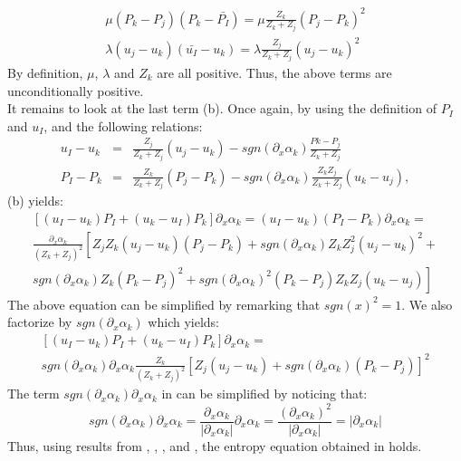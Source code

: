 \begin{eqnarray}
\label{eq:ent4}
\mu (P_k-P_j)(P_k-\bar{P_I}) = \mu \frac{Z_k}{Z_k+Z_j} (P_j - P_k)^2\nonumber\\
\lambda(u_j-u_k)(\bar{u_I}-u_k) = \lambda \frac{Z_j}{Z_k+Z_j} (u_j - u_k)^2 
\end{eqnarray}
By definition, $\mu$, $\lambda$ and $Z_k$ are all positive. Thus, the above terms are unconditionally positive. \\
It remains to look at the last term (b). Once again, by using the definition of $P_I$ and $u_I$, and the following relations:
\begin{eqnarray}
\label{eq:ent4bis}
u_I-u_k &=& \frac{Z_j}{Z_k+Z_j}(u_j-u_k) -  sgn(\partial_x \alpha_k) \frac{Pk-P_j}{Z_k+Z_j} \nonumber\\
P_I-P_k &=& \frac{Z_k}{Z_k+Z_j} (P_j-P_k) - sgn(\partial_x \alpha_k) \frac{Z_k Z_j}{Z_k+Z_j} (u_k-u_j), \nonumber 
\end{eqnarray}
(b) yields:
\begin{eqnarray}
\label{eq:ent5}
\left[ (u_I-u_k)P_I + (u_k-u_I)P_k \right] \partial_x \alpha_k = (u_I-u_k)(P_I-P_k) \partial_x \alpha_k=  \nonumber\\ \frac{\partial_x \alpha_k}{\left( Z_k+Z_j \right)^2} \left[ Z_j Z_k (u_j-u_k)(P_j-P_k)+sgn(\partial_x \alpha_k) Z_k Z_j^2 (u_j-u_k)^2 \right. + \\ \left. sgn(\partial_x \alpha_k)Z_k(P_k-P_j)^2 +  sgn(\partial_x \alpha_k)^2(P_k-P_j)Z_k Z_j (u_k-u_j) \right] \nonumber
\end{eqnarray}
The above equation can be simplified by remarking that $sgn(x)^2 = 1$. We also factorize by $sgn(\partial_x \alpha_k)$ which yields:
\begin{eqnarray}
\label{eq:ent6}
\left[ (u_I-u_k)P_I + (u_k-u_I)P_k \right] \partial_x \alpha_k =  \nonumber\\ sgn(\partial_x \alpha_k) \partial_x \alpha_k\frac{Z_k}{\left( Z_k+Z_j \right)^2} \left[ Z_j (u_j-u_k)+sgn(\partial_x \alpha_k)(P_k-P_j)\right]^2
\end{eqnarray}
The term $sgn(\partial_x \alpha_k) \partial_x \alpha_k$ in  can be simplified by noticing that: 
\begin{equation}
\label{eq:ent7}
sgn(\partial_x \alpha_k) \partial_x \alpha_k = \frac{\partial_x \alpha_k}{| \partial_x \alpha_k |} \partial_x \alpha_k = \frac{(\partial_x \alpha_k)^2}{| \partial_x \alpha_k |} = | \partial_x \alpha_k | 
\end{equation}
Thus, using results from , , ,  and , the entropy equation obtained in \cite{SEM} holds.
\pagebreak{}